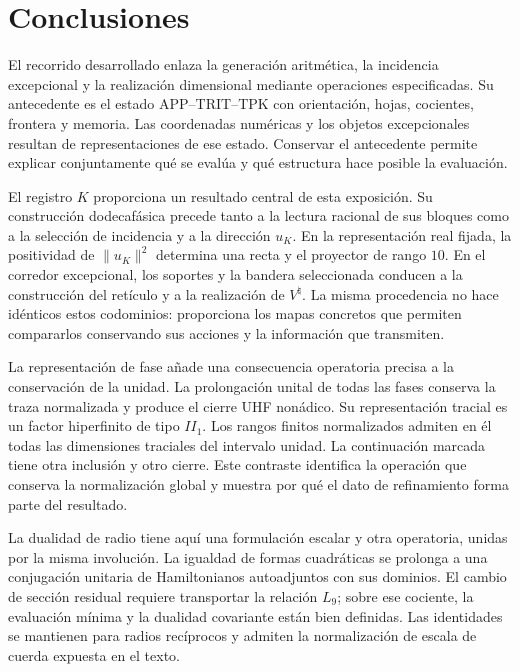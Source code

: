\section{Conclusiones}
\label{iv:conclusiones}

El recorrido desarrollado enlaza la generación aritmética, la incidencia
excepcional y la realización dimensional mediante operaciones
especificadas. Su antecedente es el estado APP--TRIT--TPK con
orientación, hojas, cocientes, frontera y memoria. Las coordenadas
numéricas y los objetos excepcionales resultan de representaciones
de ese estado. Conservar el antecedente permite explicar conjuntamente
qué se evalúa y qué estructura hace posible la evaluación.

El registro \(K\) proporciona un resultado central de esta exposición.
Su construcción dodecafásica precede tanto a la lectura racional de
sus bloques como a la selección de incidencia y a la dirección
\(u_K\). En la representación real fijada, la positividad de
\(\|u_K\|^2\) determina una recta y el proyector de rango \(10\).
En el corredor excepcional, los soportes y la bandera seleccionada
conducen a la construcción del retículo y a la realización de
\(V^\natural\). La misma procedencia no hace idénticos estos
codominios: proporciona los mapas concretos que permiten compararlos
conservando sus acciones y la información que transmiten.

La representación de fase añade una consecuencia operatoria precisa
a la conservación de la unidad. La prolongación unital de todas las
fases conserva la traza normalizada y produce el cierre UHF nonádico.
Su representación tracial es un factor hiperfinito de tipo \(II_1\).
Los rangos finitos normalizados admiten en él todas las dimensiones
traciales del intervalo unidad. La continuación marcada tiene otra
inclusión y otro cierre. Este contraste identifica la operación que
conserva la normalización global y muestra por qué el dato de
refinamiento forma parte del resultado.

La dualidad de radio tiene aquí una formulación escalar y otra
operatoria, unidas por la misma involución. La igualdad de formas
cuadráticas se prolonga a una conjugación unitaria de Hamiltonianos
autoadjuntos con sus dominios. El cambio de sección residual requiere
transportar la relación \(L_9\); sobre ese cociente, la evaluación
mínima y la dualidad covariante están bien definidas. Las identidades
se mantienen para radios recíprocos y admiten la normalización de
escala de cuerda expuesta en el texto.

